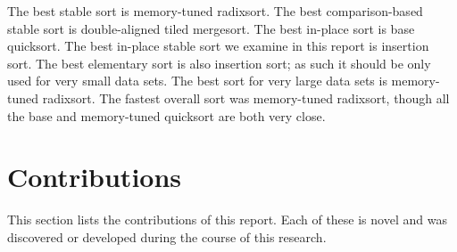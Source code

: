 
The best stable sort is memory-tuned radixsort. The best comparison-based stable
sort is double-aligned tiled mergesort. The best in-place sort is base
quicksort. The best in-place stable sort we examine in this report is insertion
sort. The best elementary sort is also insertion sort; as such it should be only
used for very small data sets. The best sort for very large data sets is
memory-tuned radixsort. The fastest overall sort was memory-tuned radixsort,
though all the base and memory-tuned quicksort are both very close.


\section{Contributions}


This section lists the contributions of this report. Each of these is novel  
and was discovered or developed during the course of this research.


